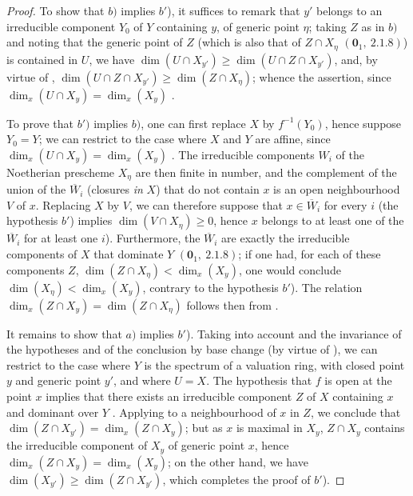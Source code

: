 \begin{proof}
To show that $b)$ implies $b'$), it suffices to remark that $y'$ belongs to an irreducible component $Y_0$ of $Y$ containing $y$, of generic point $\eta$; taking $Z$ as in $b)$ and noting that the generic point of $Z$ (which is also that of $Z\cap X_\eta$ $(\mathbf{0}_1,~2.1.8)$) is contained in $U$, we have $\dim(U\cap X_{y'})\geq\dim(U\cap Z\cap X_{y'})$, and, by virtue of , $\dim(U\cap Z\cap X_{y'})\geq\dim(Z\cap X_\eta)$; whence the assertion, since $\dim_x(U\cap X_y)=\dim_x(X_y)$ .

To prove that $b')$ implies $b)$, one can first replace $X$ by $f^{-1}(Y_0)$, hence suppose $Y_0=Y$; we can restrict to the case where $X$ and $Y$ are affine, since $\dim_x(U\cap X_y)=\dim_x(X_y)$ .
The irreducible components $W_i$ of the Noetherian prescheme $X_\eta$ are then finite in number, and the complement of the union of the $\overline{W}_i$ (closures \emph{in} $X$) that do not contain $x$ is an open neighbourhood $V$ of $x$.
Replacing $X$ by $V$, we can therefore suppose that $x\in\overline{W}_i$ for every $i$ (the hypothesis $b'$) implies $\dim(V\cap X_\eta)\geq 0$, hence $x$ belongs to at least one of the $\overline{W}_i$ for at least one $i$).
Furthermore, the $\overline{W}_i$ are exactly the irreducible components of $X$ that dominate $Y$ $(\mathbf{0}_1,~2.1.8)$; if one had, for each of these components $Z$, $\dim(Z\cap X_\eta)<\dim_x(X_y)$, one would conclude $\dim(X_\eta)<\dim_x(X_y)$, contrary to the hypothesis $b'$).
The relation $\dim_x(Z\cap X_y)=\dim(Z\cap X_\eta)$ follows then from .

It remains to show that $a)$ implies $b'$).
Taking into account  and the invariance of the hypotheses and of the conclusion by base change (by virtue of ), we can restrict to the case where $Y$ is the spectrum of a valuation ring, with closed point $y$ and generic point $y'$, and where $U=X$.
The hypothesis that $f$ is open at the point $x$ implies that there exists an irreducible component $Z$ of $X$ containing $x$ and dominant over $Y$ .
Applying  to a neighbourhood of $x$ in $Z$, we conclude that $\dim(Z\cap X_{y'})=\dim_x(Z\cap X_y)$; but as $x$ is maximal in $X_y$, $Z\cap X_y$ contains the irreducible component of $X_y$ of generic point $x$, hence $\dim_x(Z\cap X_y)=\dim_x(X_y)$; on the other hand, we have $\dim(X_{y'})\geq\dim(Z\cap X_{y'})$, which completes the proof of $b'$).
\end{proof}

